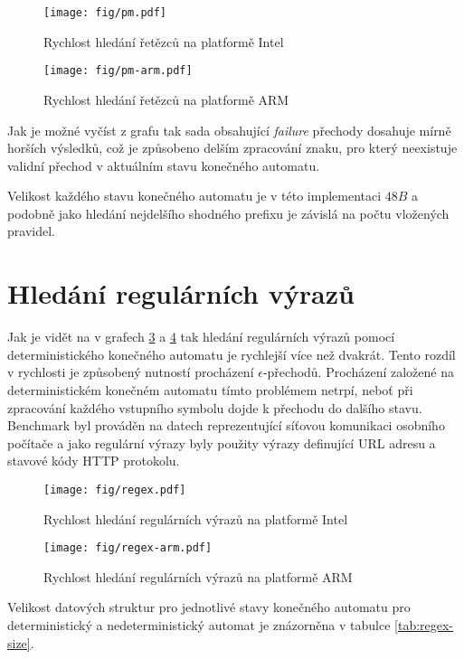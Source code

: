 \begin{figure}[H]
    \centering
    \texttt{[image: fig/pm.pdf]}
    \caption{Rychlost hledání řetězců na platformě Intel}
    \label{fig:pm}
\end{figure}

\begin{figure}[!htbp]
    \centering
    \texttt{[image: fig/pm-arm.pdf]}
    \caption{Rychlost hledání řetězců na platformě ARM}
    \label{fig:pm-arm}
\end{figure}

Jak je možné vyčíst z grafu tak sada obsahující \textit{failure} přechody dosahuje mírně horších výsledků,
což je způsobeno delším zpracování znaku, pro který neexistuje validní přechod v aktuálním stavu konečného automatu.

Velikost každého stavu konečného automatu je v této implementaci $48B$
a podobně jako hledání nejdelšího shodného prefixu je závislá na počtu vložených pravidel.

\section{Hledání regulárních výrazů} %

Jak je vidět na v grafech \ref{fig:regex} a \ref{fig:regex-arm} tak hledání regulárních výrazů pomocí deterministického konečného automatu je rychlejší více než dvakrát.
Tento rozdíl v rychlosti je způsobený nutností procházení $\epsilon$-přechodů.
Procházení založené na deterministickém konečném automatu tímto problémem netrpí,
neboť při zpracování každého vstupního symbolu dojde k přechodu do dalšího stavu.
Benchmark byl prováděn na datech reprezentující síťovou komunikaci osobního počítače a jako
regulární výrazy byly použity výrazy definující URL adresu a stavové kódy HTTP protokolu.

\begin{figure}[!htbp]
	\centering
	\texttt{[image: fig/regex.pdf]}
	\caption{Rychlost hledání regulárních výrazů na platformě Intel}
    \label{fig:regex}
\end{figure}


\begin{figure}[!htbp]
    \centering
    \texttt{[image: fig/regex-arm.pdf]}
    \caption{Rychlost hledání regulárních výrazů na platformě ARM}
    \label{fig:regex-arm}
\end{figure}
Velikost datových struktur pro jednotlivé stavy konečného automatu pro deterministický a nedeterministický
automat je znázorněna v tabulce \ref{tab:regex-size}.

